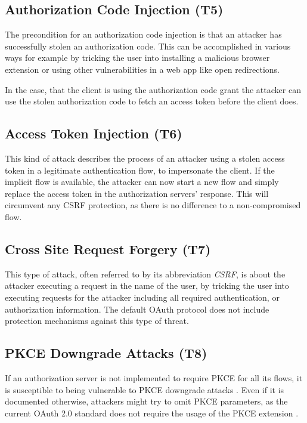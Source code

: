 \subsection[Authorization Code Injection]{Authorization Code Injection (T5)}
\label{threat:T5} 
The precondition for an authorization code injection is that an attacker has
successfully stolen an authorization code. This can be accomplished in various
ways for example by tricking the user into installing a malicious browser
extension or using other vulnerabilities in a web app like open redirections\cite{philippaerts2022oauch}.

In the case, that the client is using the authorization code grant the attacker can use the stolen authorization code to fetch an access token before the client does.

\subsection[Access Token Injection]{Access Token Injection (T6)}
\label{threat:T6}
This kind of attack describes the process of an attacker using a stolen access token in a legitimate authentication flow, to impersonate the client. If the implicit flow is available, the attacker can now start a new flow and simply replace the access token in the authorization servers' response. This will circumvent any CSRF protection, as there is no difference to a non-compromised
flow. \cite{lodderstedt2020oauth}


\subsection[Cross Site Request Forgery]{Cross Site Request Forgery (T7)}
\label{threat:T7}
This type of attack, often referred to by its abbreviation \emph{CSRF}, is about
the attacker executing a request in the name of the user, by tricking the user
into executing requests for the attacker including all required authentication,
or authorization information. The default OAuth protocol does not include
protection mechanisms against this type of threat. 

\subsection[PKCE Downgrade Attacks]{PKCE Downgrade Attacks (T8)}
\label{threat:T8}
If an authorization server is not implemented to require PKCE for all its
flows, it is susceptible to being vulnerable to PKCE downgrade attacks
\cite{philippaerts2022oauch}. Even if it is documented otherwise, attackers
might try to omit PKCE parameters, as the current OAuth 2.0 standard does not
require the usage of the PKCE extension \cite{hardt2012rfc}. 


